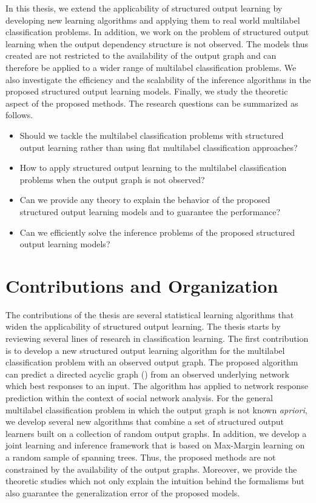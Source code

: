 In this thesis, we extend the applicability of structured output learning by developing new learning algorithms and applying them to real world multilabel classification problems.
In addition, we work on the problem of structured output learning when the output dependency structure is not observed.
The models thus created are not restricted to the availability of the output graph and can therefore be applied to a wider range of multilabel classification problems.
We also investigate the efficiency and the scalability of the inference algorithms in the proposed structured output learning models.
Finally, we study the theoretic aspect of the proposed methods.
The research questions can be summarized as follows.
\begin{itemize}
\item Should we tackle the multilabel classification problems with structured output learning rather than using flat multilabel classification approaches?
\item How to apply structured output learning to the multilabel classification problems when the output graph is not observed?
\item Can we provide any theory to explain the behavior of the proposed structured output learning models and to guarantee the performance?
\item Can we efficiently solve the inference problems of the proposed structured output learning models?
\end{itemize}



%
%
\section{Contributions and Organization}

The contributions of the thesis are several statistical learning algorithms that widen the applicability of structured output learning.
The thesis starts by reviewing several lines of research in classification learning.
The first contribution is to develop a new structured output learning algorithm for the multilabel classification problem with an observed output graph.
The proposed algorithm can predict a directed acyclic graph (\daggraph) from an observed underlying network which best responses to an input.
The algorithm has applied to network response prediction within the context of social network analysis.
For the general multilabel classification problem in which the output graph is not known \textit{apriori}, we develop several new algorithms that combine a set of structured output learners built on a collection of random output graphs.
In addition, we develop a joint learning and inference framework that is based on Max-Margin learning on a random sample of spanning trees.
Thus, the proposed methods are not constrained by the availability of the output graphs.
Moreover, we provide the theoretic studies which not only explain the intuition behind the formalisms but also guarantee the generalization error of the proposed models.

